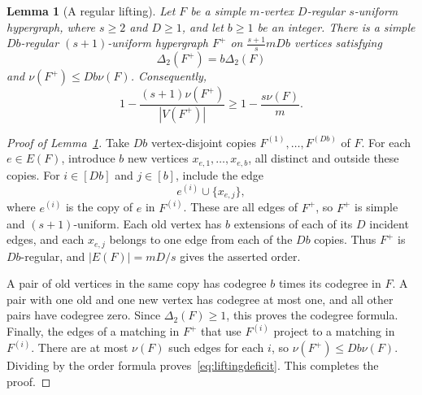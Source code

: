 \documentclass[11pt,reqno]{amsart}
\numberwithin{equation}{section}
\theoremstyle{plain}
\newtheorem{lemma}[theorem]{Lemma}
\theoremstyle{definition}
\begin{document}
\begin{lemma}[A regular lifting]\label{lem:regularlifting}
    Let $F$ be a simple $m$-vertex $D$-regular $s$-uniform hypergraph, where $s\ge2$ and $D\ge1$, and let $b\ge1$ be an integer.
    There is a simple $Db$-regular $(s+1)$-uniform hypergraph $F^+$ on $\frac{s+1}{s}mDb$ vertices satisfying
    \[
        \Delta_2(F^+)=b\Delta_2(F)
    \]
    and $\nu(F^+)\le Db\nu(F)$.
    Consequently,
    \begin{equation}\label{eq:liftingdeficit}
        1-\frac{(s+1)\nu(F^+)}{|V(F^+)|}
        \ge1-\frac{s\nu(F)}m.
    \end{equation}
\end{lemma}
\begin{proof}[Proof of Lemma~\ref{lem:regularlifting}]
    Take $Db$ vertex-disjoint copies $F^{(1)},\ldots,F^{(Db)}$ of $F$.
    For each $e\in E(F)$, introduce $b$ new vertices $x_{e,1},\ldots,x_{e,b}$, all distinct and outside these copies.
    For $i\in[Db]$ and $j\in[b]$, include the edge
    \[
        e^{(i)}\cup\{x_{e,j}\},
    \]
    where $e^{(i)}$ is the copy of $e$ in $F^{(i)}$.
    These are all edges of $F^+$, so $F^+$ is simple and $(s+1)$-uniform.
    Each old vertex has $b$ extensions of each of its $D$ incident edges, and each $x_{e,j}$ belongs to one edge from each of the $Db$ copies.
    Thus $F^+$ is $Db$-regular, and $|E(F)|=mD/s$ gives the asserted order.

    A pair of old vertices in the same copy has codegree $b$ times its codegree in $F$.
    A pair with one old and one new vertex has codegree at most one, and all other pairs have codegree zero.
    Since $\Delta_2(F)\ge1$, this proves the codegree formula.
    Finally, the edges of a matching in $F^+$ that use $F^{(i)}$ project to a matching in $F^{(i)}$.
    There are at most $\nu(F)$ such edges for each $i$, so $\nu(F^+)\le Db\nu(F)$.
    Dividing by the order formula proves~\eqref{eq:liftingdeficit}.
    This completes the proof.
\end{proof}
\end{document}

